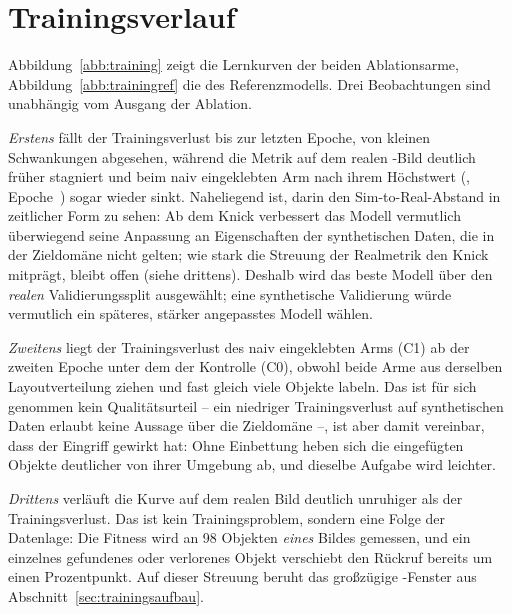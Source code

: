 \section{Trainingsverlauf}
\label{sec:trainingsverlauf}

Abbildung~\ref{abb:training} zeigt die Lernkurven der beiden Ablationsarme,
Abbildung~\ref{abb:trainingref} die des Referenzmodells. Drei Beobachtungen
sind unabhängig vom Ausgang der Ablation.

\emph{Erstens} fällt der Trainingsverlust bis zur letzten Epoche, von kleinen
Schwankungen abgesehen, während die Metrik auf dem realen -Bild
deutlich früher stagniert und beim naiv eingeklebten Arm nach ihrem Höchstwert
(\mAPall{}, Epoche~\zCOneBestEpoche) sogar wieder sinkt. Naheliegend ist, darin
den Sim-to-Real-Abstand in zeitlicher Form zu sehen: Ab dem Knick verbessert
das Modell vermutlich überwiegend seine Anpassung an Eigenschaften der
synthetischen Daten, die in der Zieldomäne nicht gelten; wie stark die Streuung
der Realmetrik den Knick mitprägt, bleibt offen (siehe drittens). Deshalb wird
das beste Modell über den \emph{realen} Validierungssplit ausgewählt; eine
synthetische Validierung würde vermutlich ein späteres, stärker angepasstes
Modell wählen.

\emph{Zweitens} liegt der Trainingsverlust des naiv eingeklebten Arms (C1)
ab der zweiten Epoche unter dem der Kontrolle (C0), obwohl beide Arme aus derselben
Layoutverteilung ziehen und fast gleich viele Objekte labeln. Das ist für sich
genommen kein Qualitätsurteil -- ein niedriger Trainingsverlust auf
synthetischen Daten erlaubt keine Aussage über die Zieldomäne --, ist aber
damit vereinbar, dass der Eingriff gewirkt hat: Ohne Einbettung heben sich die eingefügten Objekte
deutlicher von ihrer Umgebung ab, und dieselbe Aufgabe wird leichter.

\emph{Drittens} verläuft die Kurve auf dem realen Bild deutlich unruhiger als der
Trainingsverlust. Das ist kein Trainingsproblem, sondern eine Folge der
Datenlage: Die Fitness wird an 98 Objekten \emph{eines} Bildes gemessen, und ein
einzelnes gefundenes oder verlorenes Objekt verschiebt den Rückruf bereits um
einen Prozentpunkt. Auf dieser Streuung beruht das großzügige
-Fenster aus Abschnitt~\ref{sec:trainingsaufbau}.

